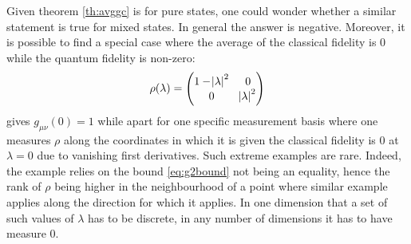 \documentclass[american,aps,pra,reprint,floatfix,nofootinbib,superscriptaddress]{revtex4-2}
\begin{document}
Given theorem \ref{th:avggc} is for pure states, one could wonder
whether a similar statement is true for mixed states. In general the answer
is negative. Moreover, it is possible to find a special case where
the average of the classical fidelity is 0 while the quantum fidelity
is non-zero:
\begin{equation}
  \rho(\lambda) =
    \begin{pmatrix}
      1 - \abs{\lambda}^2 & 0 \\
      0 & \abs{\lambda}^2
    \end{pmatrix}
\end{equation}
gives $g_{\mu\nu}(0) = 1$ while apart for one specific measurement basis where
one measures $\rho$ along the coordinates in which it is given
the classical fidelity is $0$ at $\lambda=0$ due to vanishing first derivatives.
Such extreme examples are rare. Indeed, the example relies on the bound
\eqref{eq:g2bound} not being an equality, hence the rank of $\rho$
being higher in the neighbourhood of a point where similar example applies
along the direction for which it applies. In one dimension that
a set of such values of $\lambda$ has to be discrete, in any number of
dimensions it has to have measure $0$.
\end{document}
